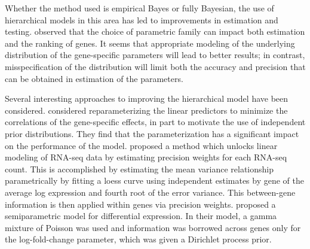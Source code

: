 Whether the method used is empirical Bayes or fully Bayesian, the use of hierarchical models in this area has led to improvements in estimation and testing. \citet{niemi} observed that the choice of parametric family can impact both estimation and the ranking of genes. It seems that appropriate modeling of the underlying distribution of the gene-specific parameters will lead to better results; in contrast, misspecification of the distribution will limit both the accuracy and precision that can be obtained in estimation of the parameters.


Several interesting approaches to improving the hierarchical model have been considered. \citet*{lithio} considered reparameterizing the linear predictors to minimize the correlations of the gene-specific effects, in part to motivate the use of independent prior distributions. They find that the parameterization has a significant impact on the performance of the model. 
\citet{voom} proposed a method which unlocks linear modeling of RNA-seq data by estimating precision weights for each RNA-seq count. This is accomplished by estimating the mean variance relationship parametrically by fitting a loess curve using independent estimates by gene of the average log expression and fourth root of the error variance. This between-gene information is then applied within genes via precision weights. \citet{liu} proposed a semiparametric model for differential expression. In their model, a gamma mixture of Poisson was used and information was borrowed across genes only for the log-fold-change parameter, which was given a Dirichlet process prior.

